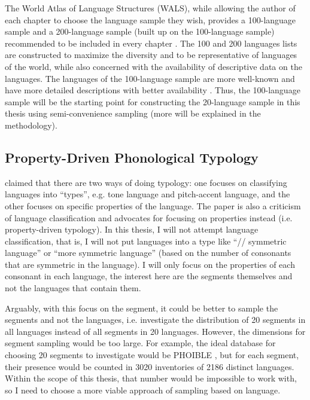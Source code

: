 \par 
The World Atlas of Language Structures (WALS), while allowing the author of each chapter to choose the language sample they wish, provides a 100-language sample and a 200-language sample (built up on the 100-language sample) recommended to be included in every chapter \citep{wals-s1}. The 100 and 200 languages lists are constructed to maximize the diversity and to be representative of languages of the world, while also concerned with the availability of descriptive data on the languages. The languages of the 100-language sample are more well-known and have more detailed descriptions with better availability \citep{wals-s1}. Thus, the 100-language sample will be the starting point for constructing the 20-language sample in this thesis using semi-convenience sampling (more will be explained in the methodology).  

\subsection{Property-Driven Phonological Typology}

\citet{hyman2009not} claimed that there are two ways of doing typology: one focuses on classifying languages into ``types'', e.g. tone language and pitch-accent language, and the other focuses on specific properties of the language. The paper is also a criticism of language classification and advocates for focusing on properties instead (i.e. property-driven typology). In this thesis, I will not attempt language classification, that is, I will not put languages into a type like ``// symmetric language'' or ``more symmetric language'' (based on the number of consonants that are symmetric in the language). I will only focus on the properties of each consonant in each language, the interest here are the segments themselves and not the languages that contain them. 

\par
Arguably, with this focus on the segment, it could be better to sample the segments and not the languages, i.e. investigate the distribution of 20 segments in all languages instead of all segments in 20 languages. However, the dimensions for segment sampling would be too large. For example, the ideal database for choosing 20 segments to investigate would be PHOIBLE \citep{phoible}, but for each segment, their presence would be counted in 3020 inventories of 2186 distinct languages. Within the scope of this thesis, that number would be impossible to work with, so I need to choose a more viable approach of sampling based on language.  